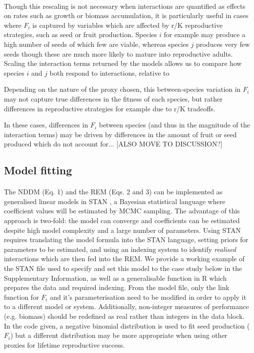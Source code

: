 \documentclass[a4,12pt]{article}
\begin{document}
\begin{itemize}
    

        \paragraph{}
        Though this rescaling is not necessary when interactions are quantified as effects on rates such as growth or biomass accumulation, it is particularly useful in cases where $F_i$ is captured by variables which are affected by r/K reproductive strategies, such as seed or fruit production. Species $i$ for example may produce a high number of seeds of which few are viable, whereas species $j$ produces very few seeds though these are much more likely to mature into reproductive adults. Scaling the interaction terms returned by the models allows us to compare how species $i$ and $j$ both respond to interactions, relative to 

        Depending on the nature of the proxy chosen, this between-species variation in $F_i$ may not capture true differences in the fitness of each species, but rather differences in reproductive strategies for example due to r/K tradeoffs. 

        In these cases, differences in $F_i$ between species (and thus in the magnitude of the interaction terms) may be driven by differences in the amount of fruit or seed produced which do not account for...  [ALSO MOVE TO DISCUSSION?] 




    \subsection{Model fitting}

        \paragraph{}        
        The NDDM (Eq. 1) and the REM (Eqs. 2 and 3) can be implemented as generalised linear models in STAN \parencite{Carpenter2017}, a Bayesian statistical language where coefficient values will be estimated by MCMC sampling. The advantage of this approach is two-fold: the model can converge and coefficients can be estimated despite high model complexity and a large number of parameters. Using STAN requires translating the model formula into the STAN language, setting priors for parameters to be estimated, and using an indexing system to identify \textit{realised} interactions which are then fed into the REM. We provide a working example of the STAN file used to specify and set this model to the case study below in the Supplementary Information, as well as a generalisable function in R which prepares the data and required indexing. From the model file, only the link function for $F_i$ and it's parameterisation need to be modified in order to apply it to a different model or system. Additionally, non-integer measures of performance (e.g. biomass) should be redefined as real rather than integers in the data block. In the code given, a negative binomial distribution is used to fit seed production ($F_i$) but a different distribution may be more appropriate when using other proxies for lifetime reproductive success.   


\end{itemize}
\end{document}
